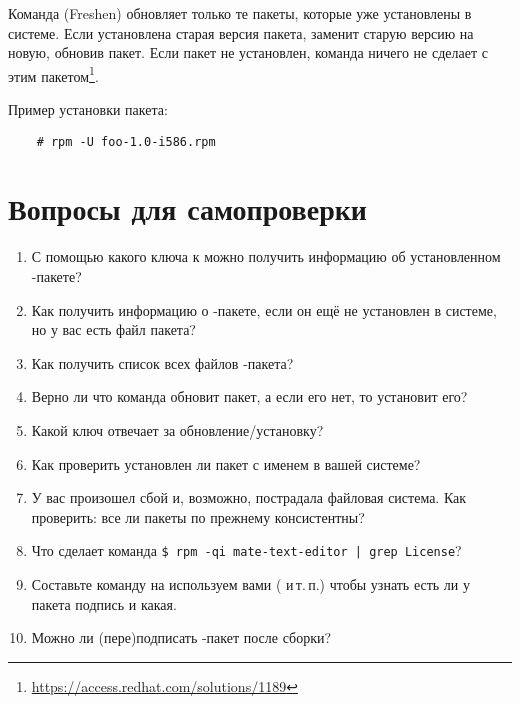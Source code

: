 Команда  (Freshen) обновляет только те пакеты, которые уже установлены 
в системе. Если установлена старая версия пакета,  заменит старую версию 
на новую, обновив пакет. Если пакет не установлен, команда  ничего не 
сделает с этим пакетом\footnote{\href{https://access.redhat.com/solutions/1189}{https://access.redhat.com/solutions/1189}}.

Пример установки пакета:
\begin{verbatim}
    # rpm -U foo-1.0-i586.rpm
\end{verbatim}


\section{Вопросы для самопроверки}

\begin{enumerate}
	\item С помощью какого ключа к  можно получить информацию об установленном -пакете?
	\item Как получить информацию о -пакете, если он ещё не установлен в системе, но у вас есть файл пакета?
	\item Как получить список всех файлов -пакета?
	\item Верно ли что команда  обновит пакет, а если его нет, то установит его?
	\item Какой ключ отвечает за обновление/установку?
	\item Как проверить установлен ли пакет с именем  в вашей системе?
	\item У вас произошел сбой и, возможно, пострадала файловая система. Как проверить: все ли пакеты по прежнему консистентны? 
	\item Что сделает команда \verb!$ rpm -qi mate-text-editor | grep License!?
	\item Составьте команду на используем вами  ( и\,т.\,п.) чтобы узнать есть ли у пакета подпись и какая.
	\item Можно ли (пере)подписать -пакет после сборки?
\end{enumerate}
